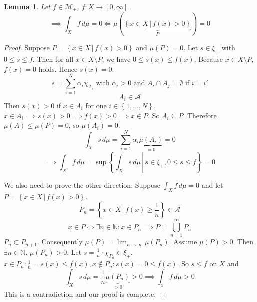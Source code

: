 \documentclass{article}
\newtheorem{lemma}{Lemma}  \numberwithin{lemma}{section}
\newcommand{\set}[1]{\left\{#1\right\}}
\newcommand{\setdef}[2]{\left\{\left.#1\,\right|\,#2\right\}}
\begin{document}
\begin{lemma} %
  Let $f \in \mathcal M_+$, $f: X \to [0,\infty]$.
  \[ \implies \int_X f \, d\mu = 0 \iff \mu(\underbrace{\setdef{x \in X}{f(x) > 0}}_{P}) = 0 \]
\end{lemma}
\begin{proof}
  Suppose $P = \setdef{x \in X}{f(x) > 0}$ and $\mu(P) = 0$.
  Let $s \in \xi_+$ with $0 \leq s \leq f$. Then for all $x \in X \setminus P$,
  we have $0 \leq s(x) \leq f(x)$. Because $x \in X \setminus P$, $f(x) = 0$ holds.
  Hence $s(x) = 0$.
  \[ s = \sum_{i=1}^N \alpha_i \chi_{A_i} \text{ with } \alpha_i > 0 \text{ and } A_i \cap A_j = \emptyset \text{ if } i = i' \]
  \[ A_i \in \mathcal A \]
  Then $s(x) > 0$ if $x \in A_i$ for one $i \in \set{1, \ldots, N}$.
  $x \in A_i \implies s(x) > 0 \implies f(x) > 0 \implies x \in P$.
  So $A_i \subseteq P$. Therefore $\mu(A) \leq \mu(P) = 0$, so $\mu(A_i) = 0$.
  \[ \int_X s \, d\mu = \sum_{i=1}^N \alpha_i \underbrace{\mu(A_i)}_{=0} = 0 \]
  \[ \implies \int_X f \, d\mu = \sup\setdef{\int_X s \, d\mu}{s \in \xi_+, 0 \leq s \leq f} = 0 \]

  We also need to prove the other direction:
  Suppose $\int_X f \, d\mu = 0$ and let $P = \setdef{x \in X}{f(x) > 0}$.
  \[ P_n = \setdef{x \in X}{f(x) \geq \frac1n} \in \mathcal A \]
  \[ x \in P \iff \exists n \in \mathbb N: x \in P_n \implies P = \bigcup_{n=1}^\infty P_n \]
  $P_n \subset P_{n+1}$. Consequently $\mu(P) = \lim_{n\to\infty} \mu(P_n)$.
  Assume $\mu(P) > 0$. Then $\exists n \in \mathbb N$. $\mu(P_n) > 0$.
  Let $s = \frac1n \cdot \chi_{P_n} \in \xi_+$.
  $x \in P_n: \frac1n = s(x) \leq f(x), x \not\in P_n: s(x) = 0 \leq f(x)$.
  So $s \leq f$ on $X$ and
  \[ \int_X s \, d\mu = \frac1n \underbrace{\mu(P_n)}_{>0} > 0 \implies \int_x f \, d\mu > 0 \]
  This is a contradiction and our proof is complete.
\end{proof}
\end{document}
